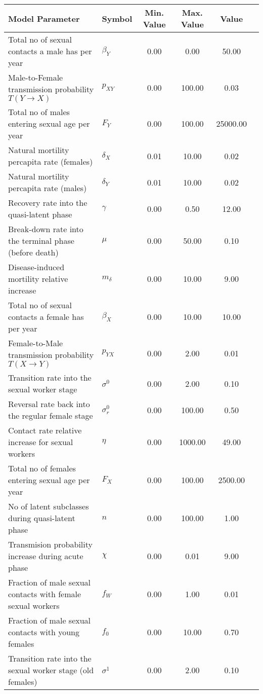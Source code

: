 \begin{table}
\centering
\begin{tabular}{p{5cm}lcccc}
{\bf Model Parameter} & {\bf Symbol} & {\bf Min. Value} & {\bf Max. Value} & {\bf Value}\\
\hline\hline
Total no of sexual contacts a male has per year & $\beta_Y$ & 0.00 & 0.00 & 50.00\\
Male-to-Female transmission probability $T(Y\rightarrow X)$ & $p_{XY}$ & 0.00 & 100.00 & 0.03\\
Total no of males entering sexual age per year & $F_Y$ & 0.00 & 100.00 & 25000.00\\
Natural mortility percapita rate (females) & $\delta_X$ & 0.01 & 10.00 & 0.02\\
Natural mortility percapita rate (males) & $\delta_Y$ & 0.01 & 10.00 & 0.02\\
Recovery rate into the quasi-latent phase & $\gamma$ & 0.00 & 0.50 & 12.00\\
Break-down rate into the terminal phase (before death) & $\mu$ & 0.00 & 50.00 & 0.10\\
Disease-induced mortility relative increase & $m_{\delta}$ & 0.00 & 10.00 & 9.00\\
Total no of sexual contacts a female has per year & $\beta_X$ & 0.00 & 10.00 & 10.00\\
Female-to-Male transmission probability $T(X\rightarrow Y)$ & $p_{YX}$ & 0.00 & 2.00 & 0.01\\
Transition rate into the sexual worker stage & $\sigma^0$ & 0.00 & 2.00 & 0.10\\
Reversal rate back into the regular female stage & $\sigma^0_r$ & 0.00 & 100.00 & 0.50\\
Contact rate relative increase for sexual workers & $\eta$ & 0.00 & 1000.00 & 49.00\\
Total no of females entering sexual age per year & $F_X$ & 0.00 & 100.00 & 2500.00\\
No of latent subclasses during quasi-latent phase & $n$ & 0.00 & 100.00 & 1.00\\
Transmision probability increase during acute phase & $\chi$ & 0.00 & 0.01 & 9.00\\
Fraction of male sexual contacts with female sexual workers & $f_W$ & 0.00 & 1.00 & 0.01\\
Fraction of male sexual contacts with young females & $f_0$ & 0.00 & 10.00 & 0.70\\
Transition rate into the sexual worker stage (old females) & $\sigma^1$ & 0.00 & 2.00 & 0.10\\

\end{tabular}
\end{table}
